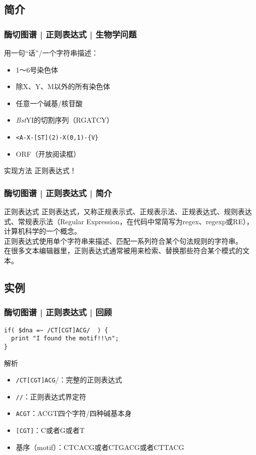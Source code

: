 \subsection{简介}
\begin{frame}[fragile]
  \frametitle{酶切图谱 | 正则表达式 | 生物学问题}
  \begin{block}{用一句“话”/一个字符串描述：}
    \begin{itemize}
      \item 1～6号染色体
      \item 除X、Y、M以外的所有染色体
      \item 任意一个碱基/核苷酸
      \item \textit{Bst}YI的切割序列（RGATCY）
      \item \verb|<A-X-[ST](2)-X(0,1)-{V}|
      \item ORF（开放阅读框）
    \end{itemize}
  \end{block}
  \pause
  \begin{block}{实现方法}
    正则表达式！
  \end{block}
\end{frame}

\begin{frame}
  \frametitle{酶切图谱 | 正则表达式 | 简介}
  \begin{block}{正则表达式}
    正则表达式，又称正规表示式、正规表示法、正规表达式、规则表达式、常规表示法（Regular Expression，在代码中常简写为regex、regexp或RE），计算机科学的一个概念。\\
    \vspace{1em}
    \alert{正则表达式使用单个字符串来描述、匹配一系列符合某个句法规则的字符串。}\\
    \vspace{1em}
    在很多文本编辑器里，正则表达式通常被用来检索、替换那些符合某个模式的文本。
  \end{block}
\end{frame}

\subsection{实例}
\begin{frame}[fragile]
  \frametitle{酶切图谱 | 正则表达式 | 回顾}
\begin{lstlisting}
if( $dna =~ /CT[CGT]ACG/  ) {
  print "I found the motif!!\n";
}
\end{lstlisting}
\pause
\begin{block}{\alert{解析}}
  \begin{itemize}
    \item \verb|/CT[CGT]ACG|/：完整的正则表达式
    \item \verb|//|：正则表达式界定符
    \item \verb|ACGT|：ACGT四个字符/四种碱基本身
    \item \verb|[CGT]|：C或者G或者T
    \item 基序（motif）：CTCACG或者CTGACG或者CTTACG
  \end{itemize}
\end{block}
\end{frame}

